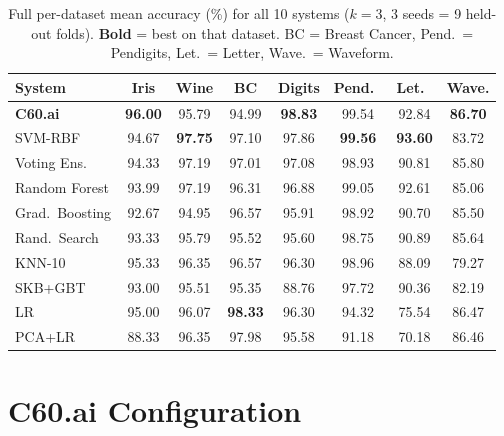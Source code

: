 \documentclass{article}
\theoremstyle{definition}
\theoremstyle{plain}
\theoremstyle{remark}
\newcommand{\sys}[1]{\textbf{\textcolor{c60blue}{#1}}}
\begin{document}
\begin{table}[H]
  \caption{%
    Full per-dataset mean accuracy (\%) for all 10 systems
    ($k=3$, 3 seeds = 9 held-out folds).
    \textbf{Bold} = best on that dataset.
    BC = Breast Cancer, Pend.\ = Pendigits, Let.\ = Letter, Wave.\ = Waveform.%
  }
  \label{tab:full}
  \begin{center}
    \begin{small}
      \begin{tabular}{lccccccc}
        \toprule
        System          & Iris           & Wine  & BC    & Digits         & Pend.\ & Let.\  & Wave.          \\
        \midrule
        \sys{C60.ai}             & \textbf{96.00} & 95.79 & 94.99 & \textbf{98.83} & 99.54 & 92.84 & \textbf{86.70} \\
        SVM-RBF         & 94.67 & \textbf{97.75} & 97.10 & 97.86 & \textbf{99.56} & \textbf{93.60} & 83.72 \\
        Voting Ens.\    & 94.33 & 97.19 & 97.01 & 97.08 & 98.93 & 90.81 & 85.80 \\
        Random Forest   & 93.99 & 97.19 & 96.31 & 96.88 & 99.05 & 92.61 & 85.06 \\
        Grad.\ Boosting & 92.67 & 94.95 & 96.57 & 95.91 & 98.92 & 90.70 & 85.50 \\
        Rand.\ Search   & 93.33 & 95.79 & 95.52 & 95.60 & 98.75 & 90.89 & 85.64 \\
        KNN-10          & 95.33 & 96.35 & 96.57 & 96.30 & 98.96 & 88.09 & 79.27 \\
        SKB+GBT         & 93.00 & 95.51 & 95.35 & 88.76 & 97.72 & 90.36 & 82.19 \\
        LR              & 95.00 & 96.07 & \textbf{98.33} & 96.30 & 94.32 & 75.54 & 86.47 \\
        PCA+LR          & 88.33 & 96.35 & 97.98 & 95.58 & 91.18 & 70.18 & 86.46 \\
        \bottomrule
      \end{tabular}
    \end{small}
  \end{center}
\end{table}

\section{C60.ai Configuration}
\label{app:config}
\end{document}
